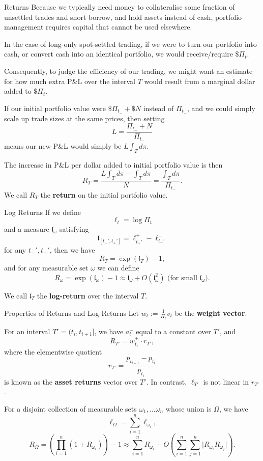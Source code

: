 \documentclass{beamer}
\begin{document}
\begin{frame}{Returns}
	Because we typically need money to collateralise some fraction of unsettled trades and short borrow, and hold assets instead of cash, portfolio management requires capital that cannot be used elsewhere.

	In the case of long-only spot-settled trading, if we were to turn our portfolio into cash, or convert cash into an identical portfolio, we would receive/require $\$\Pi_t$.

	\pause

	Consequently, to judge the efficiency of our trading, we might want an estimate for how much extra P\&L over the interval $T$ would result from a marginal dollar added to $\$\Pi_t$.

	\pause

	If our initial portfolio value were $\$\Pi_{t_-}+\$N$ instead of $\Pi_{t_-}$, and we could simply scale up trade sizes at the same prices, then setting
	$$L = \frac{\Pi_{t_-}+N}{\Pi_{t_-}}$$
	means our new P\&L would simply be $L \int_T d\pi$.

	\pause

	The increase in P\&L per dollar added to initial portfolio value is then
	$$R_T = \frac{L \int_T d\pi - \int_T d\pi}{N} = \frac{\int_T d\pi}{\Pi_{t_-}}.$$
	We call $R_T$ the \textbf{return} on the initial portfolio value.
\end{frame}

\begin{frame}{Log Returns}
	If we define
	$$\ell_t = \log \Pi_t$$ %
	and a measure $\mathfrak{l}_\omega$ satisfying
	$$\mathfrak{l}_{[t_-',t_+']}= \ell_{t_+'}^+ - \ell_{t_-'}^-$$
	for any $t_-',t_+'$, then we have
	$$R_T = \exp(\mathfrak{l}_T) - 1,$$
	and for any measurable set $\omega$ we can define
	$$R_\omega = \exp(\mathfrak{l}_\omega) - 1 \approx \mathfrak{l}_\omega + O(\mathfrak{l}_\omega^2)\textrm{ (for small }\mathfrak{l}_\omega\textrm{)}.$$

	We call $\mathfrak{l}_T$ the \textbf{log-return} over the interval $T$.
\end{frame}

\begin{frame}{Properties of Returns and Log-Returns}
	Let $w_t := \frac{1}{\Pi_t}v_t$ be the \textbf{weight vector}.%

	For an interval $T' = (t_i,t_{i+1}]$, we have $a_t^-$ equal to a constant over $T'$, and
	$$R_{T'} = w_{t_i}^+ \cdot r_{T'},$$
	where the elementwise quotient
	$$r_{T'} = \frac{p_{t_{i+1}} - p_{t_i}}{p_{t_i}}$$
	is known as the \textbf{asset returns} vector over $T'$. In contrast, $\ell_{T'}$ is not linear in $r_{T'}$. %

	For a disjoint collection of measurable sets $\omega_1,\ldots\omega_n$ whose union is $\Omega$, we have
	$$\ell_\Omega = \sum_{i=1}^n \ell_{\omega_i},$$
	$$R_\Omega = \left(\prod_{i=1}^n (1+R_{\omega_i})\right) - 1 \approx \sum_{i=1}^n R_{\omega_i} + O\left(\sum_{i=1}^n\sum_{j=1}^n \vert R_{\omega_i} R_{\omega_j} \vert\right).$$
\end{frame}
\end{document}
